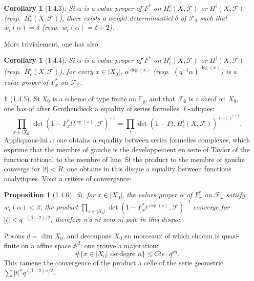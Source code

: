 \documentclass[12pt,a4paper]{article}
\theoremstyle{plain}
\newtheorem{proposition}[theorem]{Proposition}
\newtheorem{corollary}[theorem]{Corollary}
\theoremstyle{definition}
\theoremstyle{definition}
\newtheorem{para}{}[section]
\theoremstyle{remark}
\begin{document}
\begin{corollary}[1.4.3]
Si $\alpha$ is a value proper of $F^*$ on $H_c^i(X, \mathscr{F})$ or $H^i(X, \mathscr{F})$ (resp.~$H_c^i(X, \mathscr{F})$), there exists a weight determinantiel $\delta$ of $\mathscr{F}_0$ such that $w_\iota(\alpha) = \delta$ (resp.~$w_\iota(\alpha) = \delta + 2$).
\end{corollary}

More trivialement, one has also

\begin{corollary}[1.4.4]
Si $\alpha$ is a value proper of $F^*$ on $H_c^i(X, \mathscr{F})$ or $H^i(X, \mathscr{F})$ (resp.~$H_c^i(X, \mathscr{F})$), for every $x \in |X_0|$, $\alpha^{\deg(x)}$ (resp.~$(q^{-1}\alpha)^{\deg(x)}$) is a value proper of $F_x^*$ on $\mathscr{F}_{\overline{x}}$.
\end{corollary}

\begin{para}[1.4.5]
Si $X_0$ is a scheme of type finite on $\mathbb{F}_q$, and that $\mathscr{F}_0$ is a sheaf on $X_0$, one has of after Grothendieck a equality of series formelles $\ell$-adiques:
\begin{equation}\tag{1.4.5.1}
\prod_{x \in |X_0|} \det(1 - F_x^* t^{\deg(x)}, \mathscr{F})^{-1} = \prod_i \det(1 - Ft, H_c^i(X, \mathscr{F}))^{(-1)^{i+1}}.
\end{equation}
Appliquons-lui $\iota$: one obtains a equality between series formelles complexes, which exprime that the membre of gauche is the developpement en serie of Taylor of the function rational to the membre of line. Si the product to the membre of gauche converge for $|t| < R$, one obtains in this disque a equality between functions analytiques. Voici a critere of convergence:
\end{para}

\begin{proposition}[1.4.6]
Si, for $x \in |X_0|$, the values proper $\alpha$ of $F_x^*$ on $\mathscr{F}_{\overline{x}}$ satisfy $w_\iota(\alpha) < \beta$, the product $\prod_{x \in |X_0|} \det(1 - F_x^* t^{\deg(x)}, \mathscr{F})^{-1}$ converge for $|t| < q^{-(\beta+2)/2}$, therefore n'a ni zero ni pole in this disque.
\end{proposition}

Posons $d = \dim X_0$, and decoupons $X_0$ en morceaux of which chacun is quasi-finite on a affine space $\mathbb{A}^d$: one trouve a majoration:
\[\#\{x \in |X_0| \text{ de degre } n\} \leq Cte \cdot q^{dn}.\]
This ramene the convergence of the product a celle of the serie geometric $\sum |t|^n q^{(\beta+2)n/2}$.
\end{document}
